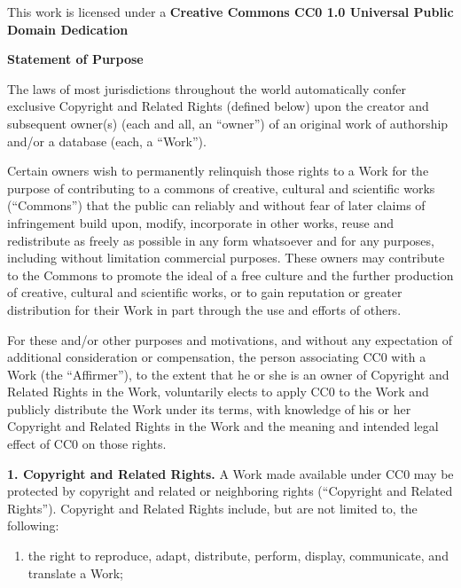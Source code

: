 \noindent This work is licensed under a \newline
\textbf{Creative Commons CC0 1.0 Universal Public Domain Dedication}

\noindent \textbf{Statement of Purpose}

{
  
  \setlength{\parskip}{0em}

  \noindent The laws of most jurisdictions throughout the world
  automatically confer exclusive Copyright and Related Rights
  (defined below) upon the creator and subsequent owner(s) (each
  and all, an ``owner'') of an original work of authorship and/or
  a database (each, a ``Work'').

  \noindent Certain owners wish to permanently relinquish those rights
  to a Work for the purpose of contributing to a commons of
  creative, cultural and scientific works (``Commons'') that the
  public can reliably and without fear of later claims of
  infringement build upon, modify, incorporate in other works,
  reuse and redistribute as freely as possible in any form
  whatsoever and for any purposes, including without limitation
  commercial purposes. These owners may contribute to the
  Commons to promote the ideal of a free culture and the further
  production of creative, cultural and scientific works, or to
  gain reputation or greater distribution for their Work in part
  through the use and efforts of others.

  \noindent For these and/or other purposes and motivations, and
  without any expectation of additional consideration or
  compensation, the person associating CC0 with a Work (the
  ``Affirmer''), to the extent that he or she is an owner of
  Copyright and Related Rights in the Work, voluntarily elects
  to apply CC0 to the Work and publicly distribute the Work
  under its terms, with knowledge of his or her Copyright and
  Related Rights in the Work and the meaning and intended legal
  effect of CC0 on those rights.

  \noindent \textbf{1. Copyright and Related Rights.}
  A Work made available under CC0 may be protected by
  copyright and related or neighboring rights (``Copyright and
  Related Rights''). Copyright and Related Rights include, but
  are not limited to, the following:

  \begin{enumerate}[label=\roman*.]
    
    \item the right to reproduce, adapt, distribute, perform,
    display, communicate, and translate a Work;
    

\end{enumerate}}
